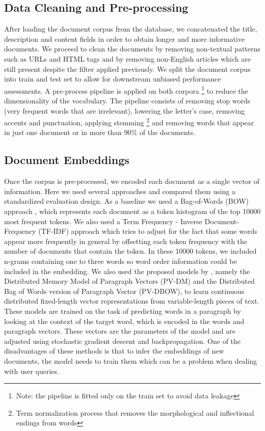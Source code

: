 \documentclass[a4paper]{article}
\begin{document}
\subsection*{Data Cleaning and Pre-processing}
After loading the document corpus from the database, we concatenated the title, description and content fields in order to obtain longer and more informative documents. We proceed to clean the documents by removing non-textual patterns such as URLs and HTML tags and by removing non-English articles which are still present despite the filter applied previously. We split the document corpus into train and test set to allow for downstream unbiased performance assessments. A pre-process pipeline is applied on both corpora \footnote{Note: the pipeline is fitted only on the train set to avoid data leakage} to reduce the dimensionality of the vocabulary. The pipeline consists of removing stop words (very frequent words that are irrelevant), lowering the letter's case, removing accents and punctuation, applying stemming \footnote{Term normalization process that removes the morphological and inflectional endings from words} and removing words that appear in just one document or in more than 90\% of the documents.

\subsection*{Document Embeddings}
Once the corpus is pre-processed, we encoded each document as a single vector of information. Here we used several approaches and compared them using a standardized evaluation design. As a baseline we used a Bag-of-Words (BOW) approach \citep{harris1954}, which represents each document as a token histogram of the top 10000 most frequent tokens. We also used a Term Frequency - Inverse Document-Frequency (TF-IDF) approach \citep{jones1972} which tries to adjust for the fact that some words appear more frequently in general by offsetting each token frequency with the number of documents that contain the token. In these 10000 tokens, we included n-grams containing one to three words so word order information could be included in the embedding. We also used the proposed models by \citet{le2014}, namely the Distributed Memory Model of Paragraph Vectors (PV-DM) and the Distributed Bag of Words version of Paragraph Vector (PV-DBOW), to learn continuous distributed fixed-length vector representations from variable-length pieces of text. These models are trained on the task of predicting words in a paragraph by looking at the context of the target word, which is encoded in the words and paragraph vectors. These vectors are the parameters of the model and are adjusted using stochastic gradient descent and backpropagation. One of the disadvantages of these methods is that to infer the embeddings of new documents, the model needs to train them which can be a problem when dealing with user queries.
\end{document}
